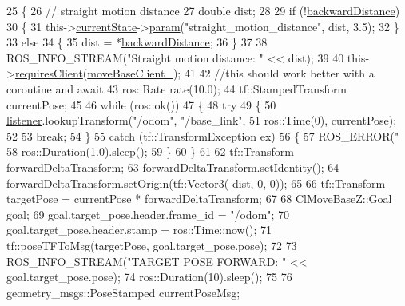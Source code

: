\begin{DoxyCode}
25 \{
26     \textcolor{comment}{// straight motion distance}
27     \textcolor{keywordtype}{double} dist;
28 
29     \textcolor{keywordflow}{if} (!\hyperlink{classmove__base__z__client_1_1CbNavigateBackwards_a53d06922eff285e4d35f4d7b1b7b7752}{backwardDistance})
30     \{
31         this->\hyperlink{classsmacc_1_1SmaccClientBehavior_af76fc9b877542ed5caf033f820c107d0}{currentState}->\hyperlink{classsmacc_1_1ISmaccState_a4982f2187ed6da337462721146e8ef70}{param}(\textcolor{stringliteral}{"straight\_motion\_distance"}, dist, 3.5);
32     \}
33     \textcolor{keywordflow}{else}
34     \{
35         dist = *\hyperlink{classmove__base__z__client_1_1CbNavigateBackwards_a53d06922eff285e4d35f4d7b1b7b7752}{backwardDistance};
36     \}
37 
38     ROS\_INFO\_STREAM(\textcolor{stringliteral}{"Straight motion distance: "} << dist);
39 
40     this->\hyperlink{classsmacc_1_1SmaccClientBehavior_a917f001e763a1059af337bf4e164f542}{requiresClient}(\hyperlink{classmove__base__z__client_1_1CbNavigateBackwards_ac94348112821680532527fa006651a6c}{moveBaseClient\_});
41 
42     \textcolor{comment}{//this should work better with a coroutine and await}
43     ros::Rate rate(10.0);
44     tf::StampedTransform currentPose;
45 
46     \textcolor{keywordflow}{while} (ros::ok())
47     \{
48         \textcolor{keywordflow}{try}
49         \{
50             \hyperlink{classmove__base__z__client_1_1CbNavigateBackwards_a13939ba95a738b73e0e26f215791d675}{listener}.lookupTransform(\textcolor{stringliteral}{"/odom"}, \textcolor{stringliteral}{"/base\_link"},
51                                      ros::Time(0), currentPose);
52 
53             \textcolor{keywordflow}{break};
54         \}
55         \textcolor{keywordflow}{catch} (tf::TransformException ex)
56         \{
57             ROS\_ERROR(\textcolor{stringliteral}{"%
58             ros::Duration(1.0).sleep();
59         \}
60     \}
61 
62     tf::Transform forwardDeltaTransform;
63     forwardDeltaTransform.setIdentity();
64     forwardDeltaTransform.setOrigin(tf::Vector3(-dist, 0, 0));
65 
66     tf::Transform targetPose = currentPose * forwardDeltaTransform;
67 
68     ClMoveBaseZ::Goal goal;
69     goal.target\_pose.header.frame\_id = \textcolor{stringliteral}{"/odom"};
70     goal.target\_pose.header.stamp = ros::Time::now();
71     tf::poseTFToMsg(targetPose, goal.target\_pose.pose);
72 
73     ROS\_INFO\_STREAM(\textcolor{stringliteral}{"TARGET POSE FORWARD: "} << goal.target\_pose.pose);
74     ros::Duration(10).sleep();
75 
76     geometry\_msgs::PoseStamped currentPoseMsg;
}
\end{DoxyCode}
